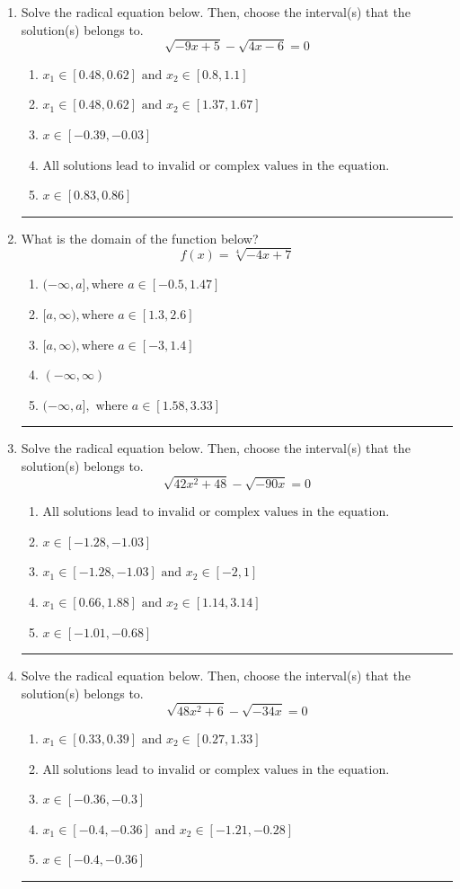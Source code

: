 \documentclass[14pt]{extbook}
\newcommand{\litem}[1]{\item#1\hspace*{-1cm}\rule{\textwidth}{0.4pt}}
\begin{document}
\begin{enumerate}
\litem{
Solve the radical equation below. Then, choose the interval(s) that the solution(s) belongs to.\[ \sqrt{-9 x + 5} - \sqrt{4 x - 6} = 0 \]\begin{enumerate}[label=\Alph*.]
\item \( x_1 \in [0.48, 0.62] \text{ and } x_2 \in [0.8,1.1] \)
\item \( x_1 \in [0.48, 0.62] \text{ and } x_2 \in [1.37,1.67] \)
\item \( x \in [-0.39,-0.03] \)
\item \( \text{All solutions lead to invalid or complex values in the equation.} \)
\item \( x \in [0.83,0.86] \)

\end{enumerate} }
\litem{
What is the domain of the function below?\[ f(x) = \sqrt[4]{-4 x + 7} \]\begin{enumerate}[label=\Alph*.]
\item \( (-\infty, a], \text{where } a \in [-0.5, 1.47] \)
\item \( [a, \infty), \text{where } a \in [1.3, 2.6] \)
\item \( [a, \infty), \text{where } a \in [-3, 1.4] \)
\item \( (-\infty, \infty) \)
\item \( (-\infty, a], \text{ where } a \in [1.58, 3.33] \)

\end{enumerate} }
\litem{
Solve the radical equation below. Then, choose the interval(s) that the solution(s) belongs to.\[ \sqrt{42 x^2 + 48} - \sqrt{-90 x} = 0 \]\begin{enumerate}[label=\Alph*.]
\item \( \text{All solutions lead to invalid or complex values in the equation.} \)
\item \( x \in [-1.28,-1.03] \)
\item \( x_1 \in [-1.28, -1.03] \text{ and } x_2 \in [-2,1] \)
\item \( x_1 \in [0.66, 1.88] \text{ and } x_2 \in [1.14,3.14] \)
\item \( x \in [-1.01,-0.68] \)

\end{enumerate} }
\litem{
Solve the radical equation below. Then, choose the interval(s) that the solution(s) belongs to.\[ \sqrt{48 x^2 + 6} - \sqrt{-34 x} = 0 \]\begin{enumerate}[label=\Alph*.]
\item \( x_1 \in [0.33, 0.39] \text{ and } x_2 \in [0.27,1.33] \)
\item \( \text{All solutions lead to invalid or complex values in the equation.} \)
\item \( x \in [-0.36,-0.3] \)
\item \( x_1 \in [-0.4, -0.36] \text{ and } x_2 \in [-1.21,-0.28] \)
\item \( x \in [-0.4,-0.36] \)


\end{enumerate}}
\end{enumerate}
\end{document}
